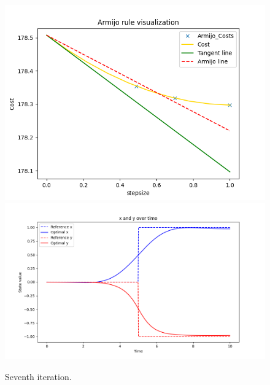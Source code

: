 \begin{figure}[H]
  \centering
  \includegraphics[width=1\textwidth]{pictures/arm_it_7.png}\hfill\\
  \includegraphics[width=1\textwidth]{pictures/new_it_7.png}\hfill
  \caption{Seventh iteration.}
  \label{fig:Reference trajectory}
\end{figure}

